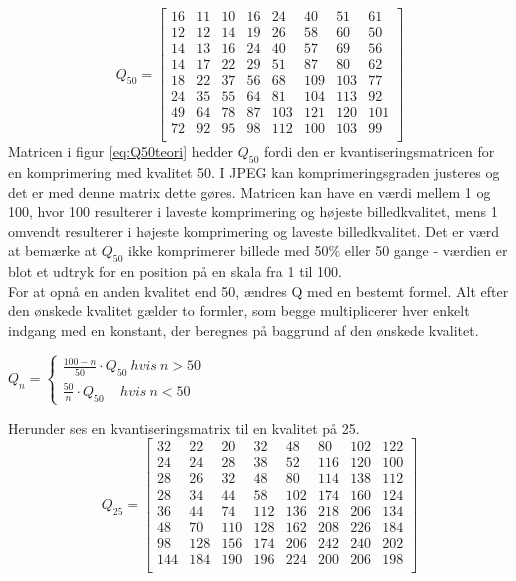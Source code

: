 \begin{equation}
Q_{50} =
\begin{bmatrix}
	16	&	11	& 10	& 16	& 	24	&	40	& 51	& 61	\\
	12	&	12	& 14	& 19	& 	26	& 	58	& 60	& 50	\\
	14	&	13	& 16	& 24	& 	40	& 	57	& 69	& 56	\\
	14	&	17	& 22	& 29	& 	51	& 	87	& 80	& 62	\\
	18	&	22	& 37	& 56	& 	68	& 	109	& 103	& 77	\\
	24	&	35	& 55	& 64	& 	81	& 	104	& 113	& 92	\\
	49	&	64	& 78	& 87	& 	103	& 	121	& 120	& 101	\\
	72	&	92	& 95	& 98	& 	112	& 	100	& 103	& 99	\\
\end{bmatrix}
\label{eq:Q50teori}
\end{equation}
Matricen i figur \vref{eq:Q50teori} hedder $Q_{50}$ fordi den er kvantiseringsmatricen for en komprimering med kvalitet 50. I JPEG kan komprimeringsgraden justeres og det er med denne matrix dette gøres. Matricen kan have en værdi mellem 1 og 100, hvor 100 resulterer i laveste komprimering og højeste billedkvalitet, mens 1 omvendt resulterer i højeste komprimering og laveste billedkvalitet. Det er værd at bemærke at $Q_{50}$ ikke komprimerer billede med 50\% eller 50 gange - værdien er blot et udtryk for en position på en skala fra 1 til 100.\\
For at opnå en anden kvalitet end 50, ændres Q med en bestemt formel. Alt efter den ønskede kvalitet gælder to formler, som begge multiplicerer hver enkelt indgang med en konstant, der beregnes på baggrund af den ønskede kvalitet.

{$Q_n=\begin{cases}
	\frac{100-n}{50} \cdot Q_{50} \ hvis \ n > 50\\
	\frac{50}{n} \cdot Q_{50} \ \ \ \ \ hvis \ n < 50
\end{cases}$}

Herunder ses en kvantiseringsmatrix til en kvalitet på 25.
\begin{equation}
Q_{25} =
\begin{bmatrix}
	32	&	22	& 20	& 32	& 	48	&	80	& 102	& 122	\\
	24	&	24	& 28	& 38	& 	52	& 	116	& 120	& 100	\\
	28	&	26	& 32	& 48	& 	80	& 	114	& 138	& 112	\\
	28	&	34	& 44	& 58	& 	102	& 	174	& 160	& 124	\\
	36	&	44	& 74	& 112	& 	136	& 	218	& 206	& 134	\\
	48	&	70	& 110	& 128	& 	162	& 	208	& 226	& 184	\\
	98	&	128	& 156	& 174	& 	206	& 	242	& 240	& 202	\\
	144	&	184	& 190	& 196	& 	224	& 	200	& 206	& 198	\\
\end{bmatrix}
\label{eq:Q25teori}
\end{equation}

